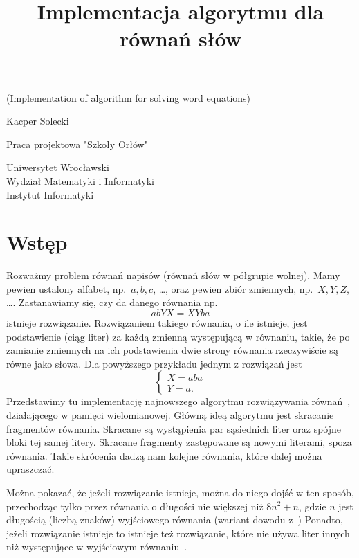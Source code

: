 \documentclass[leqno, 12pt]{article}
\title{Implementacja algorytmu dla równań słów}
\date{}
\newcommand\blankpage{%
    \null
    \thispagestyle{empty}%
    \newpage}
\begin{document}
\maketitle
\begin{center}
    (Implementation of algorithm for solving word equations)
\end{center}
\vspace{10pt}
\begin{center}
    Kacper Solecki
\end{center}
\vspace{40pt}
\begin{center}
    Praca projektowa "Szkoły Orłów"
\end{center}
\vspace{60pt}
\begin{center}
    Uniwersytet Wrocławski \\
    Wydział Matematyki i Informatyki \\
    Instytut Informatyki
\end{center}
\afterpage{\blankpage}
\newpage

\doublespacing
\tableofcontents
\singlespacing
\newpage

\section{Wstęp}
Rozważmy problem równań napisów (równań słów w półgrupie wolnej). Mamy pewien ustalony alfabet, np.\ $a, b, c$, \ldots, oraz pewien zbiór zmiennych, np.\ $X, Y, Z$, \ldots. Zastanawiamy się, czy da danego równania np. $$abYX = XYba$$ istnieje rozwiązanie. Rozwiązaniem takiego równania, o ile istnieje,
jest podstawienie (ciąg liter) za każdą zmienną występującą w równaniu, takie, że po zamianie zmiennych na ich podstawienia dwie strony równania rzeczywiście są równe jako słowa. Dla powyższego przykładu jednym z rozwiązań jest
$$
\begin{cases}
X = aba \\
Y = a.
\end{cases}
$$
Przedstawimy tu implementację najnowszego algorytmu rozwiązywania równań~\cite{DBLP:journals/jacm/Jez16}, działającego w pamięci wielomianowej.
Główną ideą algorytmu jest skracanie fragmentów równania. Skracane są wystąpienia par sąsiednich liter oraz spójne bloki tej samej litery.
Skracane fragmenty zastępowane są nowymi literami, spoza równania. Takie skrócenia dadzą nam kolejne równania, które dalej można upraszczać.

Można pokazać, że jeżeli rozwiązanie istnieje, można do niego dojść w ten sposób, przechodząc tylko przez równania o długości nie większej niż $8n^2 + n$, gdzie $n$ jest długością (liczbą znaków) wyjściowego równania (wariant dowodu z~\cite{DBLP:journals/jacm/Jez16})
Ponadto, jeżeli rozwiązanie istnieje to istnieje też rozwiązanie, które nie używa liter innych niż występujące w wyjściowym równaniu~\cite{DBLP:journals/jacm/Jez16}.
\end{document}
